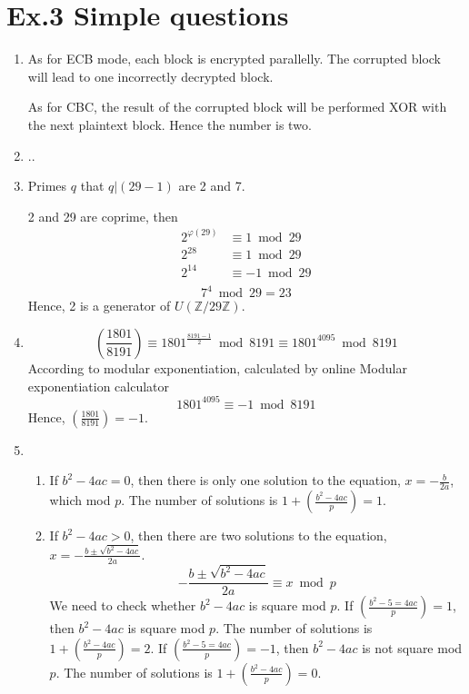 \documentclass[a4paper]{article}
\begin{document}
\section*{Ex.3 Simple questions}
	\begin{enumerate}
		\item As for ECB mode, each block is encrypted parallelly. The corrupted block will lead to one incorrectly decrypted block.

		As for CBC, the result of the corrupted block will be performed XOR with the next plaintext block. Hence the number is two.

		\item ..

		\item Primes $q$ that $q|(29-1)$ are 2 and 7.

		2 and 29 are coprime, then
		\[
		\begin{aligned}
			2^{\varphi(29)} &\equiv 1 \bmod 29 \\
			2^{28} &\equiv 1 \bmod 29 \\
			2^{14} &\equiv -1 \bmod 29 \\
		\end{aligned}
		\]
		\[
			7^{4} \bmod 29 = 23
		\]
		Hence, 2 is a generator of $U(\mathbb{Z}/29\mathbb{Z})$.

		\item
		\[
		\left(\frac{1801}{8191} \right) \equiv 1801^{\frac{8191-1}{2}} \bmod 8191 \equiv 1801^{4095} \bmod 8191
		\]
		According to modular exponentiation, calculated by online Modular exponentiation calculator
		\[
		1801^{4095} \equiv -1 \bmod 8191
		\]
		Hence, $\left(\frac{1801}{8191} \right) = -1$.

		\item
		\begin{enumerate}[$\bullet$]
			\item If $b^2-4ac = 0$, then there is only one solution to the equation, $x = -\frac{b}{2a}$, which mod $p$. The number of solutions is $1+\left( \frac{b^2-4ac}{p} \right) = 1$.
			\item If $b^2-4ac > 0$, then there are two solutions to the equation, $x = -\frac{b \pm \sqrt{b^2-4ac}}{2a}$.
			\[
			-\frac{b \pm \sqrt{b^2-4ac}}{2a} \equiv x \bmod p
			\]
			We need to check whether $b^2-4ac$ is square mod $p$. If $\left( \frac{b^2-5=4ac}{p} \right) = 1$, then $b^2-4ac$ is square mod $p$. The number of solutions is $1+\left( \frac{b^2-4ac}{p} \right) = 2$. If $\left( \frac{b^2-5=4ac}{p} \right) = -1$, then $b^2-4ac$ is not square mod $p$. The number of solutions is $1+\left( \frac{b^2-4ac}{p} \right) = 0$.
		\end{enumerate}


\end{enumerate}
\end{document}
